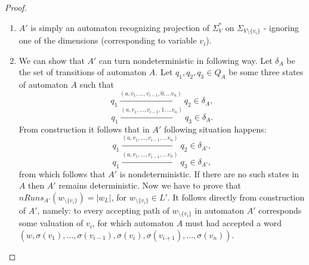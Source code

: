 \documentclass[12pt]{article}
\theoremstyle{definition}
\begin{document}
\begin{proof} \

    \begin{enumerate}
        \item $A'$ is simply an automaton recognizing projection of $\Sigma_V^*$ on $\Sigma_{V \setminus \{v_i\}}$ - ignoring one of the dimensions (corresponding to variable $v_i$).
        \item We can show that $A'$ can turn nondeterministic in following way. Let $\delta_A$ be the set of transitions of automaton $A$. Let $q_1, q_2, q_3 \in Q_A$ be some three states of automaton $A$ such that 
        $$q_1 \xrightarrow{(a, v_1, \ldots, v_{i-1}, 0, \ldots v_n)} q_2 \in \delta_A,$$ 
        $$q_1 \xrightarrow{(a, v_1, \ldots, v_{i-1}, 1, \ldots v_n)} q_3 \in \delta_A.$$
        From construction it follows that in $A'$ following situation happens:
        $$q_1 \xrightarrow{(a, v_1, \ldots, v_{i-1}, \ldots v_n)} q_2 \in \delta_{A'},$$ 
        $$q_1 \xrightarrow{(a, v_1, \ldots, v_{i-1}, \ldots v_n)} q_3 \in \delta_{A'},$$
        from which follows that $A'$ is nondeterministic. If there are no such states in $A$ then $A'$ remains deterministic. Now we have to prove that $nRuns_{A'}(w_{\setminus\{v_i\}}) = |w_L|$, for $w_{\setminus\{v_i\}} \in L'$. It follows directly from construction of $A'$, namely: to every accepting path of $w_{\setminus\{v_i\}}$ in automaton $A'$ corresponds some valuation of $v_i$, for which automaton $A$ must had accepted a word $(w, \sigma(v_1), \ldots, \sigma(v_{i-1}), \sigma(v_i), \sigma(v_{i+1}), \ldots, \sigma(v_n))$.
    \end{enumerate}
\end{proof}
\end{document}
